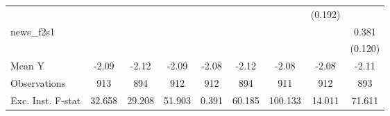{\begin{tabular}{l*{8}{c}}
            &                     &                     &                     &                     &                     &                     &     (0.192)         &                     \\
\addlinespace
news\_f2s1   &                     &                     &                     &                     &                     &                     &                     &       0.381\sym{***}\\
            &                     &                     &                     &                     &                     &                     &                     &     (0.120)         \\
\midrule
Mean Y      &       -2.09         &       -2.12         &       -2.09         &       -2.08         &       -2.12         &       -2.08         &       -2.08         &       -2.11         \\
Observations&         913         &         894         &         912         &         912         &         894         &         911         &         912         &         893         \\
Exc. Inst. F-stat&      32.658         &      29.208         &      51.903         &       0.391         &      60.185         &     100.133         &      14.011         &      71.611         \\
\bottomrule
\end{tabular}
}
